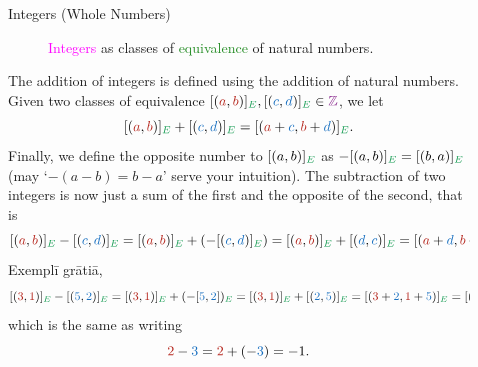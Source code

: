 \documentclass[final]{beamer}
\newlength{\sepwidth}
\newlength{\colwidth}
\newcommand{\separatorcolumn}{\begin{column}{\sepwidth}\end{column}}
\newcommand{\Z}{\mathbb{Z}}
\newcommand{\clr}{\textcolor{BrickRed}}
\newcommand{\clb}{\textcolor{RoyalBlue}}
\newcommand{\clg}{\textcolor{ForestGreen}}
\newcommand{\clm}{\textcolor{Fuchsia}}
\begin{document}
\begin{frame}[t]
\begin{columns}[t]
\begin{column}{\colwidth}
\begin{exampleblock}{Integers (Whole Numbers)}
\begin{figure}[H]
   \caption{\clm{Integers} as classes of \clg{equivalence} of natural numbers.}
   \label{fig:integers}
  \end{figure}
  The \alert{addition} of integers is defined using the addition of natural
  numbers. Given two classes of equivalence $[(\clr{a},\clr{b})]_{\clg{E}},
  [(\clb{c},\clb{d})]_{\clg{E}} \in \clm{\Z}$, we let
  \[
   [(\clr{a},\clr{b})]_{\clg{E}} + [(\clb{c}, \clb{d})]_{\clg{E}} = [(\clr{a} +
   \clb{c}, \clr{b} + \clb{d})]_{\clg{E}}.
  \]
  Finally, we define the \alert{opposite number} to $[(a,b)]_{\clg{E}}$ as
  $-[(a,b)]_{\clg{E}} = [(b,a)]_{\clg{E}}$ (may `$-(a-b) = b-a$' serve your
  intuition). The \alert{subtraction} of two integers is now just a sum of the
  first and the opposite of the second, that is
  \[
   [(\clr{a},\clr{b})]_{\clg{E}} - [(\clb{c},\clb{d})]_{\clg{E}} =
   [(\clr{a},\clr{b})]_{\clg{E}} + (-[(\clb{c},\clb{d})]_{\clg{E}}) =
   [(\clr{a},\clr{b})]_{\clg{E}} + [(\clb{d},\clb{c})]_{\clg{E}} = [(\clr{a} +
   \clb{d}, \clr{b} + \clb{c})]_{\clg{E}}.
  \]
  Exemplī grātiā,
  \[
   [(\clr{3}, \clr{1})]_{\clg{E}} - [(\clb{5},\clb{2})]_{\clg{E}} = [(\clr{3},
   \clr{1})]_{\clg{E}} + (-[\clb{5},\clb{2}])_{\clg{E}} = [(\clr{3},
   \clr{1})]_{\clg{E}} + [(\clb{2},\clb{5})]_{\clg{E}} = [(\clr{3} + \clb{2},
   \clr{1} + \clb{5})]_{\clg{E}} = [(5, 6)]_{\clg{E}},
  \]
  which is the same as writing
  \[
   \clr{2} - \clb{3} = \clr{2} + (-\clb{3}) = -1.
  \]
 \end{exampleblock}

\end{column}

\separatorcolumn

\begin{column}{\colwidth}


\end{column}
\end{columns}
\end{frame}
\end{document}
